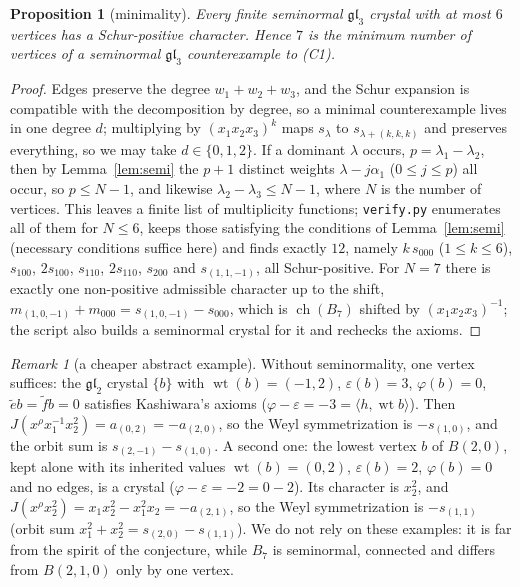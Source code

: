 \documentclass[11pt]{article}
\newtheorem{proposition}[theorem]{Proposition}
\theoremstyle{definition}
\theoremstyle{remark}
\newtheorem{remark}[theorem]{Remark}
\newcommand{\wt}{\operatorname{wt}}
\newcommand{\ch}{\operatorname{ch}}
\begin{document}
\begin{proposition}[minimality]\label{prop:min}
Every finite seminormal $\mathfrak{gl}_3$ crystal with at most $6$ vertices has a Schur-positive
character. Hence $7$ is the minimum number of vertices of a seminormal $\mathfrak{gl}_3$
counterexample to (C1).
\end{proposition}
\begin{proof}
Edges preserve the degree $w_1+w_2+w_3$, and the Schur expansion is compatible with the
decomposition by degree, so a minimal counterexample lives in one degree $d$; multiplying by
$(x_1x_2x_3)^k$ maps $s_\lambda$ to $s_{\lambda+(k,k,k)}$ and preserves everything, so we may
take $d\in\{0,1,2\}$. If a dominant $\lambda$ occurs, $p=\lambda_1-\lambda_2$, then by
Lemma~\ref{lem:semi} the $p+1$ distinct weights $\lambda-j\alpha_1$ ($0\le j\le p$) all occur,
so $p\le N-1$, and likewise $\lambda_2-\lambda_3\le N-1$, where $N$ is the number of vertices.
This leaves a finite list of multiplicity functions; \texttt{verify.py} enumerates all of them
for $N\le 6$, keeps those satisfying the conditions of Lemma~\ref{lem:semi} (necessary
conditions suffice here) and finds exactly $12$, namely
$k\,s_{000}$ ($1\le k\le6$), $s_{100}$, $2s_{100}$, $s_{110}$, $2s_{110}$, $s_{200}$ and
$s_{(1,1,-1)}$, all Schur-positive. For $N=7$ there is exactly one non-positive admissible
character up to the shift, $m_{(1,0,-1)}+m_{000}=s_{(1,0,-1)}-s_{000}$, which is
$\ch(B_7)$ shifted by $(x_1x_2x_3)^{-1}$; the script also builds a seminormal crystal for it
and rechecks the axioms.
\end{proof}

\begin{remark}[a cheaper abstract example]
Without seminormality, one vertex suffices: the $\mathfrak{gl}_2$ crystal $\{b\}$ with
$\wt(b)=(-1,2)$, $\varepsilon(b)=3$, $\varphi(b)=0$, $\tilde e b=\tilde f b=0$ satisfies
Kashiwara's axioms ($\varphi-\varepsilon=-3=\langle h,\wt b\rangle$). Then
$J(x^\rho x_1^{-1}x_2^2)=a_{(0,2)}=-a_{(2,0)}$, so the Weyl symmetrization is $-s_{(1,0)}$, and
the orbit sum is $s_{(2,-1)}-s_{(1,0)}$. A second one: the lowest vertex $b$ of $B(2,0)$, kept
alone with its inherited values $\wt(b)=(0,2)$, $\varepsilon(b)=2$, $\varphi(b)=0$ and no edges,
is a crystal ($\varphi-\varepsilon=-2=0-2$). Its character is $x_2^2$, and
$J(x^\rho x_2^2)=x_1x_2^2-x_1^2x_2=-a_{(2,1)}$, so the Weyl symmetrization is $-s_{(1,1)}$
(orbit sum $x_1^2+x_2^2=s_{(2,0)}-s_{(1,1)}$). We do not rely on these examples: it is far from the
spirit of the conjecture, while $B_7$ is seminormal, connected and differs from $B(2,1,0)$
only by one vertex.
\end{remark}
\end{document}
